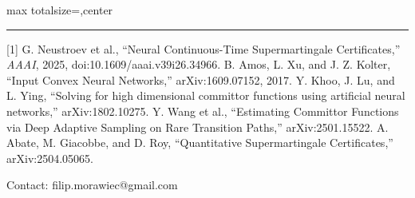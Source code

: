 \documentclass[10pt]{article}
\begin{document}
\begin{adjustbox}{max totalsize={\textwidth}{\textheight},center}
\begin{minipage}{\textwidth}
\vspace{1.5mm}
\textcolor{Rule}{\rule{\linewidth}{0.7pt}}\par
{\fontsize{7.3}{8.2}\selectfont\color{Muted}
[1] G. Neustroev et al., ``Neural Continuous-Time Supermartingale
Certificates,'' \emph{AAAI}, 2025, doi:10.1609/aaai.v39i26.34966.
\quad [2] B. Amos, L. Xu, and J. Z. Kolter, ``Input Convex Neural Networks,''
arXiv:1609.07152, 2017.
\quad [3] Y. Khoo, J. Lu, and L. Ying, ``Solving for high dimensional
committor functions using artificial neural networks,'' arXiv:1802.10275.
\quad [4] Y. Wang et al., ``Estimating Committor Functions via Deep Adaptive
Sampling on Rare Transition Paths,'' arXiv:2501.15522.
\quad [5] A. Abate, M. Giacobbe, and D. Roy, ``Quantitative Supermartingale Certificates,'' arXiv:2504.05065.

\hfill Contact: filip.morawiec@gmail.com}

\end{minipage}
\end{adjustbox}
\end{document}
